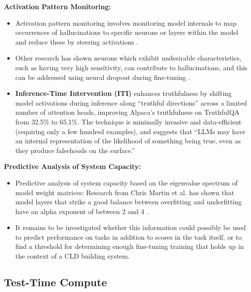 \documentclass[12pt]{article}
\begin{document}
\textbf{Activation Pattern Monitoring:}
\begin{itemize}
    \item Activation pattern monitoring involves monitoring model internals to map occurrences of hallucinations to specific neurons or layers within the model and reduce these by steering activations \cite{wang2024adaptive}.
    \item Other research has shown neurons which exhibit undesirable characteristics, such as having very high sensitivity, can contribute to hallucinations, and this can be addressed using neural dropout during fine-tuning \cite{varshney2023stitch}.
    \item \textbf{Inference-Time Intervention (ITI)} \cite{li2024inferencetimeintervention} enhances truthfulness by shifting model activations during inference along ``truthful directions'' across a limited number of attention heads, improving Alpaca's truthfulness on TruthfulQA from 32.5\% to 65.1\%. The technique is minimally invasive and data-efficient (requiring only a few hundred examples), and suggests that ``LLMs may have an internal representation of the likelihood of something being true, even as they produce falsehoods on the surface.''
\end{itemize}

\textbf{Predictive Analysis of System Capacity:}
\begin{itemize}
    \item Predictive analysis of system capacity based on the eigenvalue spectrum of model weight matrices: Research from Chris Martin et al. has shown that model layers that strike a good balance between overfitting and underfitting have an alpha exponent of between 2 and 4 \cite{martin2021predicting, martin2019traditional}.
    \item It remains to be investigated whether this information could possibly be used to predict performance on tasks in addition to scores in the task itself, or to find a threshold for determining enough fine-tuning training that holds up in the context of a CLD building system.
\end{itemize}

\subsection{Test-Time Compute}
\end{document}
